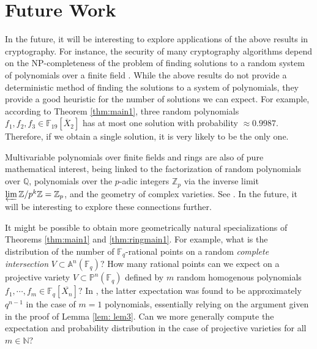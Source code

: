 \documentclass[12pt]{amsart}
\theoremstyle{definition}
\renewcommand{\AA}{\mathbb{A} }
\newcommand{\FF}{\mathbb{F} }
\newcommand{\NN}{\mathbb{N} }
\newcommand{\PP}{\mathbb{P} }
\newcommand{\QQ}{\mathbb{Q} }
\newcommand{\ZZ}{\mathbb{Z} }
\begin{document}
\section{Future Work}\label{sec:conclusion}
In the future, it will be interesting to explore applications of the above results in cryptography. For instance, the security of many cryptography algorithms depend on the NP-completeness of the problem of finding solutions to a random system of polynomials over a finite field \cite{LPTV24}. While the above results do not provide a deterministic method of finding the solutions to a system of polynomials, they provide a good heuristic for the number of solutions we can expect. For example, according to Theorem \ref{thm:main1}, three random polynomials $f_1, f_2 , f_3 \in \FF_{19}[\overline{X}_2]$ has at most one solution with probability $\approx 0.9987$. Therefore, if we obtain a single solution, it is very likely to be the only one. %

Multivariable polynomials over finite fields and rings are also of pure mathematical interest, being linked to the factorization of random polynomials over $\QQ$, polynomials over the $p$-adic integers $\ZZ_p$ via the inverse limit $\varprojlim \ZZ/p^k \ZZ = \ZZ_p$, and the geometry of complex varieties. See \cite{BV19, Shm21, Del74}. In the future, it will be interesting to explore these connections further.

It might be possible to obtain more geometrically natural specializations of Theorems \ref{thm:main1} and \ref{thm:ringmain1}. For example, what is the distribution of the number of $\FF_q$-rational points on a random \emph{complete intersection} $V \subset \AA^{n}(\FF_q)$? How many rational points can we expect on a projective variety $V \subset \PP^n(\FF_q)$ defined by $m$ random homogenous polynomials $f_1, \cdots , f_m \in \FF_q[\overline{X_n}]$? In \cite{JMW25}, the latter expectation was found to be approximately $q^{n-1}$ in the case of $m = 1$ polynomials, essentially relying on the argument given in the proof of Lemma \ref{lem: lem3}. Can we more generally compute the expectation and probability distribution in the case of projective varieties for all $m \in \NN$?
\end{document}
